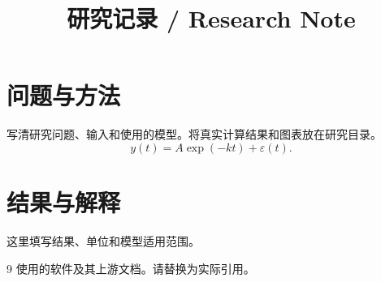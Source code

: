 \documentclass[UTF8,fontset=fandol]{ctexart}
\title{研究记录 / Research Note}
\author{}
\date{}
\begin{document}
\maketitle
\section{问题与方法}
写清研究问题、输入和使用的模型。将真实计算结果和图表放在研究目录。
\begin{equation}
  y(t)=A\exp(-kt)+\varepsilon(t).
\end{equation}
\section{结果与解释}
这里填写结果、单位和模型适用范围。
\begin{thebibliography}{9}
 使用的软件及其上游文档。请替换为实际引用。
\end{thebibliography}
\end{document}
